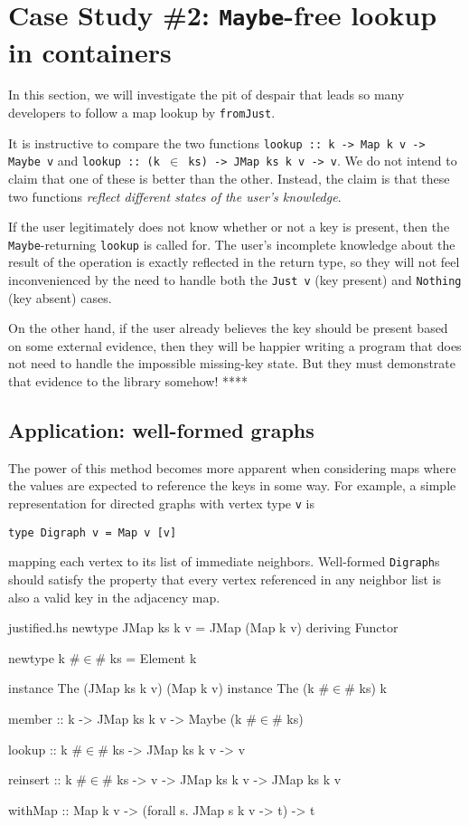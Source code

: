 \documentclass[format=sigplan, review=false, screen=true]{acmart}
\begin{document}
\section{Case Study \#2: \texttt{Maybe}-free lookup in containers}

In this section, we will investigate the pit of despair that leads so
many developers to follow a map lookup by \texttt{fromJust}.

It is instructive to compare the two functions \texttt{lookup :: k -> Map k v -> Maybe v}
and \texttt{lookup :: (k $\in$ ks) -> JMap ks k v -> v}. We do not intend to claim that
one of these is better than the other. Instead, the claim is that these two functions
\emph{reflect different states of the user's knowledge}.

If the user legitimately does not know whether or not a key is present, then the
\texttt{Maybe}-returning \texttt{lookup} is called for. The user's incomplete knowledge
about the result of the operation is exactly reflected in the return type, so they will
not feel inconvenienced by the need to handle both the \texttt{Just v} (key present)
and \texttt{Nothing} (key absent) cases.

On the other hand, if the user already believes the key should be present based on some
external evidence, then they will be happier writing a program that does not need to handle
the impossible missing-key state. But they must demonstrate that evidence to the library
somehow!  ****

\subsection{Application: well-formed graphs}

The power of this method becomes more apparent when considering maps where
the values are expected to reference the keys in some way. For example, a
simple representation for directed graphs with vertex type \texttt{v} is
\begin{verbatim}
type Digraph v = Map v [v]
\end{verbatim}
mapping each vertex to its list of immediate neighbors. Well-formed \texttt{Digraph}s
should satisfy the property that every vertex referenced in any neighbor list is also
a valid key in the adjacency map.

\begin{filecontents*}{justified.hs}
newtype JMap ks k v = JMap (Map k v)
    deriving Functor

newtype k #$\in$# ks = Element k

instance The (JMap ks k v) (Map k v)
instance The (k #$\in$# ks)  k

member ::  k -> JMap ks k v -> Maybe (k #$\in$# ks)

lookup   :: k #$\in$# ks -> JMap ks k v -> v

reinsert
  :: k #$\in$# ks -> v -> JMap ks k v -> JMap ks k v

withMap
:: Map k v  -> (forall s. JMap s k v -> t) -> t
\end{filecontents*}
\end{document}
